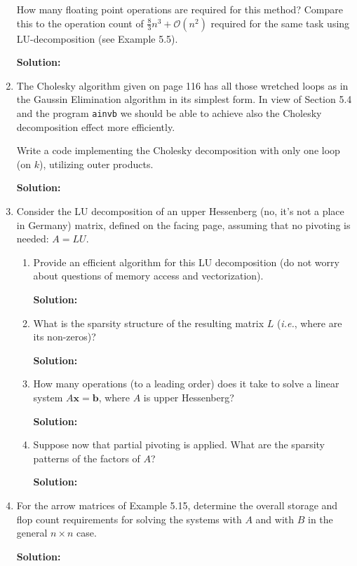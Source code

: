 \documentclass[12pt]{article}
\newcommand{\BigO}[1]{\mathcal{O}\left( #1 \right)}
\begin{document}
\begin{enumerate}
How many floating point operations are required for this method? Compare this to the operation count of
$\frac{8}{3}n^{3} + \BigO{n^{2}}$ required for the same task using LU-decomposition (see Example 5.5).

{\bf Solution:}

\item The Cholesky algorithm given on page 116 has all those wretched loops as in the Gaussin Elimination
algorithm in its simplest form. In view of Section 5.4 and the program {\tt ainvb} we should be able to
achieve also the Cholesky decomposition effect more efficiently.

Write a code implementing the Cholesky decomposition with only one loop (on $k$), utilizing outer products.

{\bf Solution:}

\item Consider the LU decomposition of an upper Hessenberg (no, it's not a place in Germany) matrix,
defined on the facing page, assuming that no pivoting is needed: $A = LU$.

\begin{enumerate}
\item Provide an efficient algorithm for this LU decomposition (do not worry about questions of memory access and vectorization).

{\bf Solution:}

\item What is the sparsity structure of the resulting matrix $L$ ({\em i.e.}, where are its non-zeros)?

{\bf Solution:}

\item How many operations (to a leading order) does it take to solve a linear system $A\mathbf{x} = \mathbf{b}$,
where $A$ is upper Hessenberg?

{\bf Solution:}

\item Suppose now that partial pivoting is applied. What are the sparsity patterns of the factors of $A$?

{\bf Solution:}
\end{enumerate}

\item For the arrow matrices of Example 5.15, determine the overall storage and flop count requirements
for solving the systems with $A$ and with $B$ in the general $n \times n$ case.

{\bf Solution:}

\end{enumerate}
\end{document}
